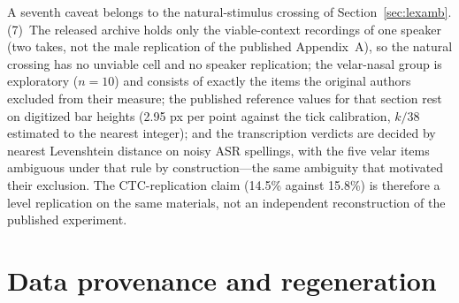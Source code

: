\documentclass[11pt,a4paper]{article}
\begin{document}
A seventh caveat belongs to the natural-stimulus crossing of
Section~\ref{sec:lexamb}. (7)~The released archive holds only the
viable-context recordings of one speaker (two takes, not the male
replication of the published Appendix~A), so the natural crossing has
no unviable cell and no speaker replication; the velar-nasal group
is exploratory ($n=10$) and consists of exactly the items the
original authors excluded from their measure; the published
reference values for that section rest on digitized bar heights
(2.95 px per point against the tick calibration, $k/38$ estimated to
the nearest integer); and the transcription verdicts are decided by
nearest Levenshtein distance on noisy ASR spellings, with the five
velar items ambiguous under that rule by construction---the same
ambiguity that motivated their exclusion. The CTC-replication claim
(14.5\% against 15.8\%) is therefore a level replication on the
same materials, not an independent reconstruction of the published
experiment.

\section{Data provenance and regeneration}
\label{sec:provenance}
\end{document}
